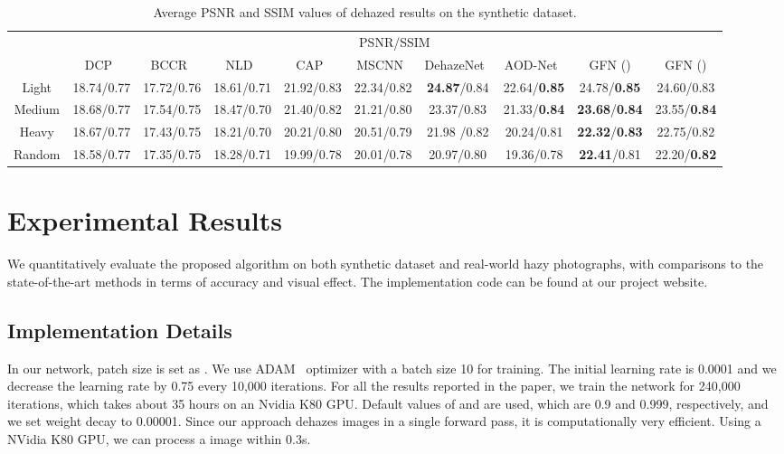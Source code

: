 \documentclass[10pt,twocolumn,letterpaper]{article}
\begin{document}
\begin{table*}[htbp]
	\caption{Average PSNR and SSIM values of dehazed results on the synthetic dataset.}
	\begin{center}\scriptsize{
			\begin{tabular}{cccccccccc}
				\toprule
				\multirow{2}{*}{} &	\multicolumn{9}{c}{PSNR/SSIM}\\
				\cline{2-10}
				& DCP~\cite{he2011single} & BCCR~\cite{meng2013efficient} & NLD~\cite{berman2016non}& CAP~\cite{zhu2015fast} & MSCNN~\cite{ren2016single} & DehazeNet~\cite{cai2016dehazenet} & AOD-Net~\cite{li2017aod} & GFN () & GFN () \\
				\midrule
				Light & 18.74/0.77 & 17.72/0.76 & 18.61/0.71 & 21.92/0.83 & 22.34/0.82 & \textbf{24.87}/0.84 & 22.64/\textbf{0.85}  & 24.78/\textbf{0.85} & 24.60/0.83 \\
				\midrule
				Medium & 18.68/0.77 & 17.54/0.75 & 18.47/0.70 & 21.40/0.82 & 21.21/0.80 & 23.37/0.83 & 21.33/\textbf{0.84}  &\textbf{23.68}/\textbf{0.84} & 23.55/\textbf{0.84}\\
				\midrule
				Heavy & 18.67/0.77 & 17.43/0.75 & 18.21/0.70 & 20.21/0.80 & 20.51/0.79 & 21.98 /0.82 & 20.24/0.81 &\textbf{22.32}/\textbf{0.83} & 22.75/0.82\\
				\midrule
				Random & 18.58/0.77 & 17.35/0.75 & 18.28/0.71 & 19.99/0.78 & 20.01/0.78 & 20.97/0.80 & 19.36/0.78  &\textbf{22.41}/0.81 & 22.20/\textbf{0.82}\\
				\bottomrule
		\end{tabular}}
		\label{tab-psnr-ssim}
	\end{center}
	\vspace{-0.8cm}
\end{table*}
\vspace{-0.2cm}
\section{Experimental Results}
We quantitatively evaluate the proposed algorithm on both synthetic dataset and
real-world hazy photographs, with comparisons to the state-of-the-art methods
in terms of accuracy and visual effect. The implementation code can be found at our project website. 


\subsection{Implementation Details}
In our network, patch size is set as .
We use ADAM~\cite{kingma2014adam} optimizer with a batch size
10 for training. The initial learning rate is 0.0001 and we decrease the learning rate by 0.75 every 10,000 iterations.
For all the results reported in the paper, we train the
network for 240,000 iterations, which takes about 35 hours
on an Nvidia K80 GPU. Default values of  and 
are used, which are 0.9 and 0.999, respectively, and
we set weight decay to 0.00001.
Since our approach dehazes images in a single forward pass, it is computationally
very efficient. Using a NVidia K80 GPU, we can process a  image within 0.3s.
\end{document}
